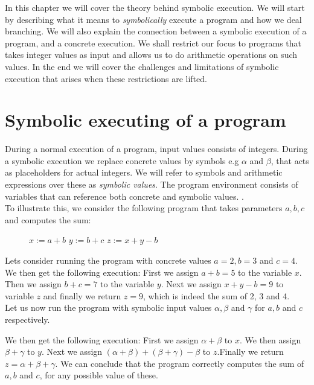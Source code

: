 In this chapter we will cover the theory behind symbolic execution. We will start by describing what it means to \emph{symbolically} execute a program and how we deal branching. We will also explain the connection between a symbolic execution of a program, and a concrete execution. We shall restrict our focus to programs that takes integer values as input and allows us to do arithmetic operations on such values. In the end we will cover the challenges and limitations of symbolic execution that arises when these restrictions are lifted. 


\section{Symbolic executing of a program}
	
	During a normal execution of a program, input values consists of integers. During a symbolic execution we replace concrete values by symbols e.g $\alpha$ and $ \beta$, that acts as placeholders for actual integers. We will refer to symbols and arithmetic expressions over these as \emph{symbolic values}.
	 The program environment consists of variables that can reference both concrete and symbolic values. \cite{CadarSen13} \cite{King76}.
	\\
	To illustrate this, we consider the following program that takes parameters $a, b, c$ and computes the sum:
	\begin{figure}[!h]
		\begin{algorithmic}
			\State $ x := a + b$
			\State $ y := b + c$
			\State $ z := x + y - b$
			\State {}
			\EndProcedure
		\end{algorithmic}
	\end{figure}

	\sumprogram{}
	\newpage
	Lets consider running the program with concrete values $a = 2, b = 3$ and $c = 4$. We then get the following execution:
	First we assign $a+b = 5$ to the variable $x$. Then we assign $b + c = 7$ to the variable $y$. Next we assign $x + y - b = 9$ to variable $z$ and finally we return $z = 9$, which is indeed the sum of 2, 3 and 4. 
	\\
	Let us now run the program with symbolic input values $\alpha, \beta$ and $\gamma$ for $a, b$ and $c$ respectively. 

	
	We then get the following execution: First we assign $\alpha + \beta$ to $x$. We then assign $\beta + \gamma$ to $y$. Next we assign $(\alpha + \beta) + (\beta + \gamma) - \beta$ to $z$.Finally we return $z = \alpha + \beta + \gamma$. We can conclude that the program correctly computes the sum of $a, b$ and $c$, for any possible value of these.
	
